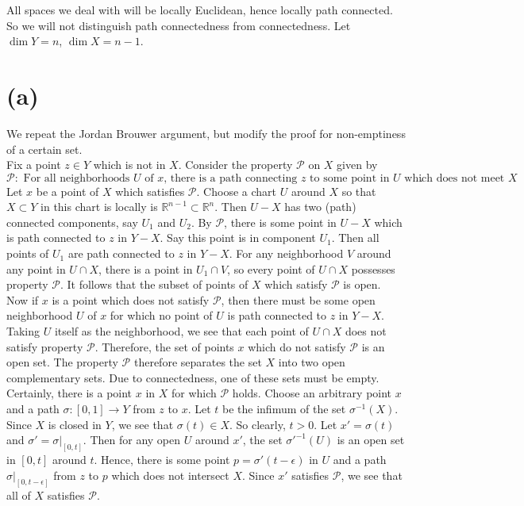 \documentclass{amsbook}
\theoremstyle{theorem}
\theoremstyle{plain}
\theoremstyle{remark}
\newcommand{\R}{\mathbb R}
\newcommand{\PP}{\mathscr P}
\begin{document}
All spaces we deal with will be locally Euclidean, hence locally path connected. So we will not distinguish path connectedness from connectedness. Let $\dim Y = n$, $\dim X = n-1$. 

\section*{(a)}

We repeat the Jordan Brouwer argument, but modify the proof for non-emptiness of a certain set.\\

Fix a point $z \in Y$ which is not in $X$. Consider the property $\PP$ on $X$ given by \[\PP: \text{ For all neighborhoods $U$ of $x$, there is a path connecting $z$ to some point in $U$ which does not meet $X$}.\] Let $x$ be a point of $X$ which satisfies $\PP$. Choose a chart $U$ around $X$ so that $X\subset Y$ in this chart is locally is $\R^{n-1} \subset \R^n$. Then $U-X$ has two (path) connected components, say $U_1$ and $U_2$. By $\PP$, there is some point in $U-X$ which is path connected to $z$ in $Y-X$. Say this point is in component $U_1$. Then all points of $U_1$ are path connected to $z$ in $Y-X$. For any neighborhood $V$ around any point in $U\cap X$, there is a point in $U_1 \cap V$, so every point of $U\cap X$ possesses property $\PP$. It follows that the subset of points of $X$ which satisfy $\PP$ is open.\\

Now if $x$ is a point which does not satisfy $\PP$, then there must be some open neighborhood $U$ of $x$ for which no point of $U$ is path connected to $z$ in $Y-X$. Taking $U$ itself as the neighborhood, we see that each point of $U\cap X$ does not satisfy property $\PP$. Therefore, the set of points $x$ which do not satisfy $\PP$ is an open set. The property $\PP$ therefore separates the set $X$ into two open complementary sets. Due to connectedness, one of these sets must be empty.\\

Certainly, there is a point $x$ in $X$ for which $\PP$ holds. Choose an arbitrary point $x$ and a path $\sigma: [0,1]\to Y$ from $z$ to $x$. Let $t$ be the infimum of the set $\sigma^{-1}(X)$. Since $X$ is closed in $Y$, we see that $\sigma(t) \in X$. So clearly, $t>0$. Let $x' = \sigma(t)$ and $\sigma' = \sigma|_{[0,t]}$. Then for any open $U$ around $x'$, the set $\sigma'^{-1}(U)$ is an open set in $[0,t]$ around $t$. Hence, there is some point $p = \sigma'(t-\epsilon)$ in $U$ and a path $\sigma|_{[0,t-\epsilon]}$ from $z$ to $p$ which does not intersect $X$. Since $x'$ satisfies $\PP$, we see that all of $X$ satisfies $\PP$. \\
\end{document}
